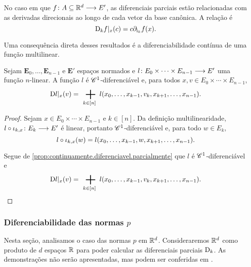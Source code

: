 No caso em que $f\colon \allowbreak A \subseteq \mathbb{R}^d \longrightarrow E'$, as diferenciais parciais estão relacionadas com as derivadas direcionais ao longo de cada vetor da base canônica. A relação é
	\begin{equation*}
	\mathrm{D}_k f|_x(c) = c \partial_{\mathrm{i}_k} f(x).
	\end{equation*}


Uma consequência direta desses resultados é a diferenciabilidade contínua de uma função multilinear.

\begin{proposition}
\label{prop:diferencial.multilinear}
Sejam $\bm E_0, \ldots, \bm E_{n-1}$ e $\bm E'$ espaços normados e $l\colon \allowbreak E_0 \times \cdots \times E_{n-1} \longrightarrow E'$ uma função $n$-linear. A função $l$ é $\mathscr{C}^1$-diferenciável e, para todos $x,v \in E_0 \times \cdots \times E_{n-1}$,
	\begin{equation*}
	\D l|_x(v) = \sum_{k \in [n]} l(x_0,\ldots,x_{k-1},v_k,x_{k+1},\ldots,x_{n-1}).
	\end{equation*}
\end{proposition}
\begin{proof}
Sejam $x \in E_0 \times \cdots \times E_{n-1}$ e $k \in [n]$. Da definição multilinearidade, $l \circ \iota_{k,x}\colon \allowbreak E_k \longrightarrow E'$ é linear, portanto $\mathscr{C}^1$-diferenciável e, para todo $w \in E_k$,
	\begin{equation*}
	l \circ \iota_{k,x}(w) = l(x_0,\ldots,x_{k-1},w,x_{k+1},\ldots,x_{n-1}).
	\end{equation*}

Segue de \ref{prop:continuamente.diferenciavel.parcialmente} que $l$ é $\mathscr{C}^1$-diferenciável e
	\begin{equation*}
	\D l|_x(v) = \sum_{k \in [n]} l(x_0,\ldots,x_{k-1},v_k,x_{k+1},\ldots,x_{n-1}).
	\qedhere
	\end{equation*}
\end{proof}




\subsubsection{Diferenciabilidade das normas \texorpdfstring{$p$}{p}}

Nesta seção, analisamos o caso das normas $p$ em $\mathbb{R}^d$. Consideraremos $\mathbb{R}^d$ como produto de $d$ espaços $\mathbb{R}$ para poder calcular as diferenciais parciais $\mathrm{D}_k$. As demonstrações não serão apresentadas, mas podem ser conferidas em \cite[]{liv:Coleman-CalculusNormedVectorSpaces}.

